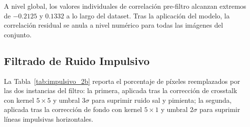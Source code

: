 A nivel global, los valores individuales de correlación pre-filtro alcanzan extremos de $-0.2125$ y $0.1332$ a lo largo del dataset. Tras la aplicación del modelo, la correlación residual se anula a nivel numérico para todas las imágenes del conjunto.


\subsection{Filtrado de Ruido Impulsivo}

La Tabla~\ref{tab:impulsivo_2b} reporta el porcentaje de píxeles reemplazados por las dos instancias del filtro: la primera, aplicada tras la corrección de crosstalk con kernel $5\times5$ y umbral $3\sigma$ para suprimir ruido sal y pimienta; la segunda, aplicada tras la corrección de fondo con kernel $5\times1$ y umbral $2\sigma$ para suprimir líneas impulsivas horizontales.

